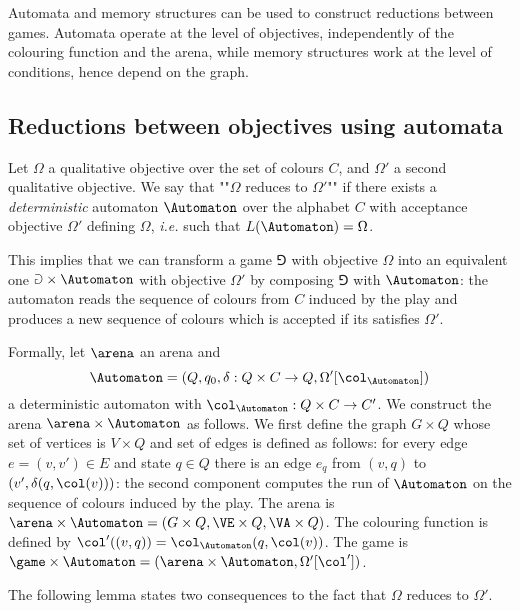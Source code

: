 Automata and memory structures can be used to construct reductions between games.
Automata operate at the level of objectives, independently of the colouring function and the arena,
while memory structures work at the level of conditions, hence depend on the graph.

\subsection*{Reductions between objectives using automata}
Let $\Omega$ a qualitative objective over the set of colours $C$, and $\Omega'$ a second qualitative objective.
We say that ""$\Omega$ reduces to $\Omega'$"" if there exists a \textit{deterministic} automaton $\Automaton$ over the alphabet $C$ with acceptance objective $\Omega'$ defining $\Omega$, \textit{i.e.} such that $L(\Automaton) = \Omega$.


This implies that we can transform a game $\Game$ with objective $\Omega$ into an equivalent one $\Game \times \Automaton$ with objective $\Omega'$ by composing $\Game$ with $\Automaton$: 
the automaton reads the sequence of colours from $C$ induced by the play and 
produces a new sequence of colours which is accepted if its satisfies $\Omega'$.

Formally, let $\arena$ an arena and 
\[
\Automaton = (Q,q_0,\delta : Q \times C \to Q,\Omega'[\col_\Automaton])
\]
a deterministic automaton with $\col_\Automaton : Q \times C \to C'$.
We construct the arena $\arena \times \Automaton$ as follows.
We first define the graph $G \times Q$ whose set of vertices is $V \times Q$ and set of edges is defined as follows:
for every edge $e = (v,v') \in E$ and state $q \in Q$ there is an edge $e_q$ from $(v,q)$ to $(v',\delta(q,\col(v)))$:
the second component computes the run of $\Automaton$ on the sequence of colours induced by the play.
The arena is $\arena \times \Automaton = (G \times Q, \VE \times Q, \VA \times Q)$.
The colouring function is defined by $\col'((v,q)) = \col_\Automaton(q,\col(v))$.
The game is $\game \times \Automaton = (\arena \times \Automaton, \Omega'[\col'])$. 

The following lemma states two consequences to the fact that $\Omega$ reduces to $\Omega'$.

